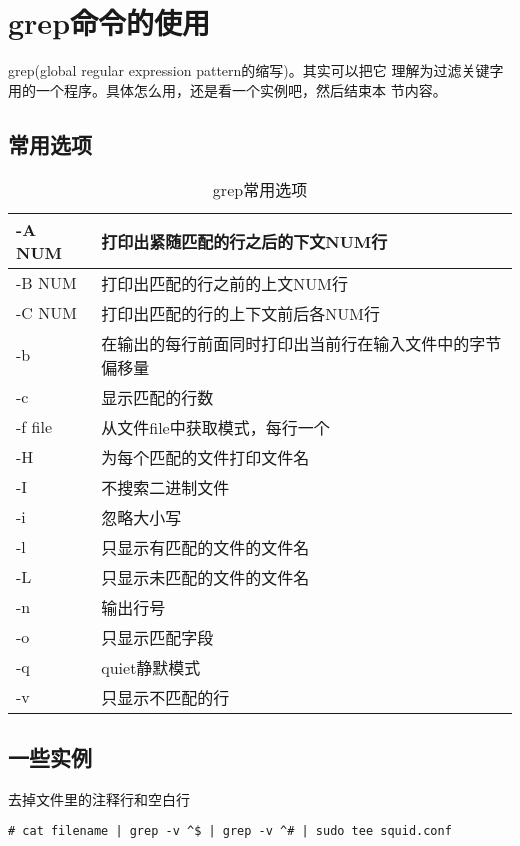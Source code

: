\section{grep命令的使用}
\label{sec:grepCmd}

grep(global regular expression pattern的缩写)。其实可以把它
理解为过滤关键字用的一个程序。具体怎么用，还是看一个实例吧，然后结束本
节内容。

\subsection{常用选项}

\begin{table}[!htbp]
  \centering
  \caption{grep常用选项}
  \begin{tabular}{l|l}
    \hline
    -A NUM  & 打印出紧随匹配的行之后的下文NUM行 \\
    \hline
    -B NUM  & 打印出匹配的行之前的上文NUM行 \\
    \hline
    -C NUM  & 打印出匹配的行的上下文前后各NUM行 \\
    \hline
    -b      & 在输出的每行前面同时打印出当前行在输入文件中的字节偏移量 \\
    \hline
    -c      & 显示匹配的行数 \\
    \hline
    -f file & 从文件file中获取模式，每行一个 \\
    \hline
    -H      & 为每个匹配的文件打印文件名 \\
    \hline
    -I      & 不搜索二进制文件 \\
    \hline
    -i      & 忽略大小写 \\
    \hline
    -l      & 只显示有匹配的文件的文件名 \\
    \hline
    -L      & 只显示未匹配的文件的文件名 \\
    \hline
    -n      & 输出行号 \\
    \hline
    -o      & 只显示匹配字段 \\
    \hline
    -q      & quiet静默模式 \\
    \hline
    -v      & 只显示不匹配的行 \\
    \hline
  \end{tabular}
\end{table}

\subsection{一些实例}

去掉文件里的注释行和空白行
\begin{verbatim}
# cat filename | grep -v ^$ | grep -v ^# | sudo tee squid.conf
\end{verbatim}

